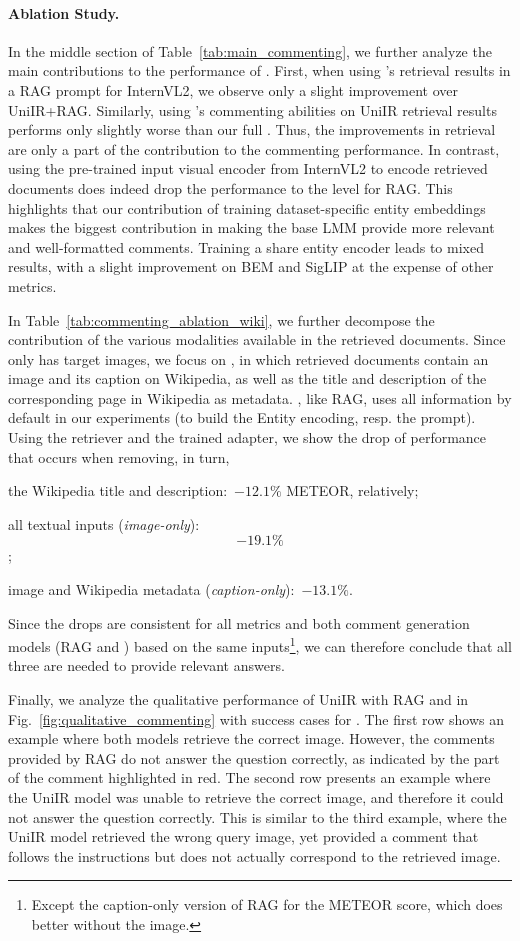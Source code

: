 \paragraph{Ablation Study.} 
In the middle section of Table~\ref{tab:main_commenting}, we further analyze the main contributions to the performance of \modelname.
First, when using \modelname's retrieval results in a RAG prompt for InternVL2, we observe only a slight improvement over UniIR+RAG.
Similarly, using \modelname's commenting abilities on UniIR retrieval results performs only slightly worse than our full \modelname.
Thus, the improvements in retrieval are only a part of the contribution to the commenting performance.
In contrast, using the pre-trained input visual encoder from InternVL2 to encode retrieved documents does indeed drop the performance to the level for RAG.
This highlights that our contribution of training dataset-specific entity embeddings makes the biggest contribution in making the base LMM provide more relevant and well-formatted comments.
Training a share entity encoder leads to mixed results, with a slight improvement on BEM and SigLIP at the expense of other metrics.

In Table~\ref{tab:commenting_ablation_wiki}, we further decompose the contribution of the various modalities available in the retrieved documents.
Since \cirrcomment only has target images, we focus on \wikicomment, in which retrieved documents contain an image and its caption on Wikipedia, as well as the title and description of the corresponding page in Wikipedia as metadata.
\modelname, like RAG, uses all information by default in our experiments (to build the Entity encoding, resp. the prompt).
Using the \modelname retriever and the trained adapter, we show the drop of performance that occurs when removing, in turn,
\begin{enumerate*}[\roman*)]
\item the Wikipedia title and description:~$-12.1\%$  METEOR, relatively;
\item all textual inputs (\emph{image-only}):~$$-19.1\%$$;
\item image and Wikipedia metadata (\emph{caption-only}):~$-13.1\%$.
\end{enumerate*}
Since the drops are consistent for all metrics and both comment generation models (RAG and \modelname) based on the same inputs\footnote{Except the caption-only version of RAG for the METEOR score, which does better without the image.}, we can therefore conclude that all three are needed to provide relevant answers. %


Finally, we analyze the qualitative performance of UniIR with RAG and \modelname in Fig.~\ref{fig:qualitative_commenting} with success cases for \modelname.
The first row shows an example where both models retrieve the correct image. 
However, the comments provided by RAG do not answer the question correctly, as indicated by the part of the comment highlighted in red. 
The second row presents an example where the UniIR model was unable to retrieve the correct image, and therefore it could not answer the question correctly. 
This is similar to the third example, where the UniIR model retrieved the wrong query image, yet provided a comment that follows the instructions but does not actually correspond to the retrieved image. 